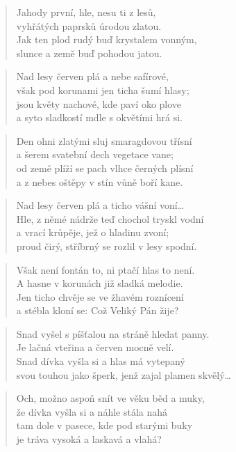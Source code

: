 \documentclass{book}
\begin{document}
\begin{verse}
Jahody první, hle, nesu ti z lesů,\\
vyhřátých paprsků úrodou zlatou.\\
Jak ten plod rudý buď krystalem vonným,\\
slunce a země buď pohodou jatou.
\end{verse}
\newpage
{}
\begin{verse}
Nad lesy červen plá a nebe safírové,\\
však pod korunami jen ticha šumí hlasy;\\
jsou květy nachové, kde paví oko plove\\
a syto sladkostí mdle s okvětími hrá si.
\end{verse}
\begin{verse}
Den ohni zlatými sluj smaragdovou třísní\\
a šerem svatební dech vegetace vane;\\
od země plíží se pach vlhce černých plísní\\
a z nebes oštěpy v stín vůně boří kane.
\end{verse}
\begin{verse}
Nad lesy červen plá a ticho vášní voní\ldots\\
Hle, z němé nádrže teď chochol tryskl vodní\\
a vrací krůpěje, jež o hladinu zvoní;\\
proud čirý, stříbrný se rozlil v lesy spodní.
\end{verse}
\begin{verse}
Však není fontán to, ni ptačí hlas to není.\\
A hasne v korunách již sladká melodie.\\
Jen ticho chvěje se ve žhavém roznícení\\
a stébla kloní se: Což Veliký Pán žije?
\end{verse}
\begin{verse}
Snad vyšel s píšťalou na stráně hledat panny.\\
Je lačná vteřina a červen mocně velí.\\
Snad dívka vyšla si a hlas má vytepaný\\
svou touhou jako šperk, jenž zajal plamen skvělý\ldots
\end{verse}
\begin{verse}
Och, možno aspoň snít ve věku běd a muky,\\
že dívka vyšla si a náhle stála nahá\\
tam dole v pasece, kde pod starými buky\\
je tráva vysoká a laskavá a vlahá?
\end{verse}
\end{document}

